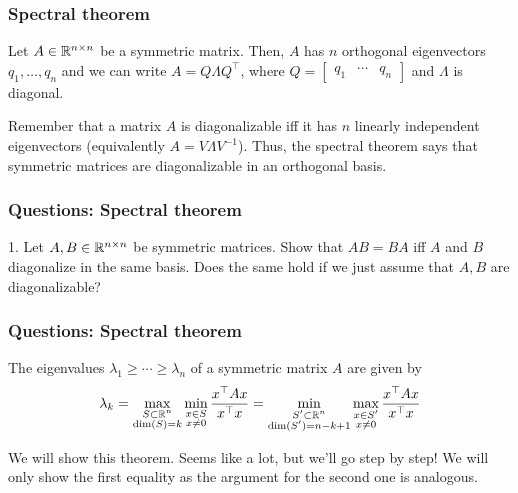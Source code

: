 \documentclass{beamer}
\begin{document}
\begin{frame}[t]
\frametitle{Spectral theorem}
\begin{theorem}
Let $A \in \mathbb{R}^{n \times n}$ be a symmetric matrix. Then, $A$ has $n$ orthogonal eigenvectors $q_1, \dots, q_n$ and we can write $A = Q \Lambda Q^\top$, where $Q = \begin{bmatrix} q_1 & \cdots & q_n \end{bmatrix}$ and $\Lambda$ is diagonal.
\end{theorem}

Remember that a matrix $A$ is diagonalizable iff it has $n$ linearly independent eigenvectors (equivalently $A = V \Lambda V^{-1}$). Thus, the spectral theorem says that symmetric matrices are diagonalizable in an orthogonal basis.
\end{frame}

\begin{frame}[t]
\frametitle{Questions: Spectral theorem}
1. Let $A, B \in \mathbb{R}^{n \times n}$ be symmetric matrices. Show that $AB = BA$ iff $A$ and $B$ diagonalize in the same basis. Does the same hold if we just assume that $A,B$ are diagonalizable?
\pause
\end{frame}

\begin{frame}[t]
\frametitle{Questions: Spectral theorem}
\begin{theorem}
The eigenvalues $\lambda_1 \geq \cdots \geq \lambda_n$ of a symmetric matrix $A$ are given by
\begin{align*}
\lambda_k = \max_{\substack{S \subset \mathbb{R}^n \\ \text{dim}(S) = k}} \min_{\substack{x \in S \\ x \neq 0}} \frac{x^\top A x}{x^\top x} = \min_{\substack{S' \subset \mathbb{R}^n \\ \text{dim}(S') = n-k+1}} \max_{\substack{x \in S' \\ x \neq 0}} \frac{x^\top A x}{x^\top x}
\end{align*}
\end{theorem}
We will show this theorem. Seems like a lot, but we'll go step by step! We will only show the first equality as the argument for the second one is analogous.
\end{frame}
\end{document}
